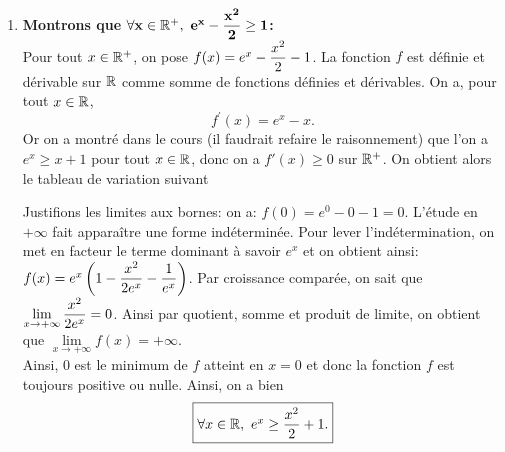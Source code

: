 \documentclass[a4paper, 11pt]{article}
\begin{document}
\begin{correction}
\begin{enumerate}
\begin{itemize}
\item[$\bullet$] On montre de m\^eme la deuxi\`eme in\'egalit\'e en \'etudiant la fonction $g(x)=\ln{(1+x)}-x$.
\end{itemize}
\item \textbf{Montrons que $\mathbf{\forall x\in\mathbb{R}^+,\ e^x - \displaystyle \frac{x^2}{2}\geq 1}$:}\\
\noindent Pour tout $x\in\mathbb{R}^+$, on pose $f(x)=e^x-\displaystyle \frac{x^2}{2}-1$. La fonction $f$ est d\'efinie et d\'erivable sur $\mathbb{R}$ comme somme de fonctions d\'efinies et d\'erivables. On a, pour tout $x\in\mathbb{R}$,
$$f^{\prime}(x)=e^x-x.$$
Or on a montr\'e dans le cours (il faudrait refaire le raisonnement) que l'on a $e^x \geq x+1$ pour tout $x \in \mathbb{R}$, donc on a $f'(x) \geq 0$ sur $\mathbb{R}^+$. On obtient alors le tableau de variation suivant
\begin{center}
\end{center}
Justifions les limites aux bornes: on a: $f(0)=e^0-0-1=0$. L'\'etude en $+\infty$ fait appara\^{i}tre une forme ind\'etermin\'ee. Pour lever l'ind\'etermination, on met en facteur le terme dominant \`{a} savoir $e^x$ et on obtient ainsi: $f(x)=e^x\left( 1-\displaystyle\frac{x^2}{2e^x}-\displaystyle\frac{1}{e^x}  \right)$. Par croissance compar\'ee, on sait que $\lim\limits_{x\to +\infty} \displaystyle\frac{x^2}{2e^x}=0$. Ainsi par quotient, somme et produit de limite, on obtient que $\lim\limits_{x\to +\infty}  f(x)=+\infty$.\\
\noindent Ainsi, $0$ est le minimum de $f$ atteint en $x=0$ et donc la fonction $f$ est toujours positive ou nulle. Ainsi, on a bien 
$$\fbox{$ \forall x\in \mathbb{R},\ e^x\geq \displaystyle \frac{x^2}{2}+1. $}$$

\end{enumerate}
\end{correction}
\end{document}
